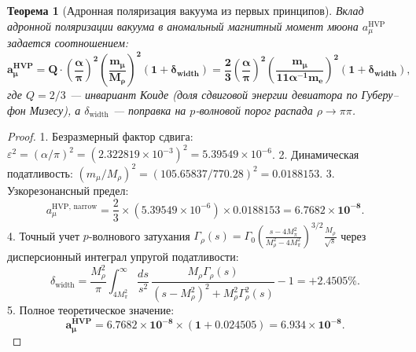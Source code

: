 \documentclass[11pt,a4paper,oneside]{article}
\theoremstyle{plain}
\newtheorem{theorem}{Теорема}[section]
\theoremstyle{definition}
\theoremstyle{remark}
\numberwithin{equation}{section}
\begin{document}
	\begin{theorem}[Адронная поляризация вакуума из первых принципов]
		Вклад адронной поляризации вакуума в аномальный магнитный момент мюона $a_\mu^{\text{HVP}}$ задается соотношением:
		\begin{equation}
			\mathbf{a_\mu^{\text{HVP}} = Q \cdot \left(\frac{\alpha}{\pi}\right)^2 \left(\frac{m_\mu}{M_\rho}\right)^2 (1 + \delta_{\text{width}}) = \frac{2}{3} \left(\frac{\alpha}{\pi}\right)^2 \left(\frac{m_\mu}{11 \alpha^{-1} m_e}\right)^2 (1 + \delta_{\text{width}})},
			\label{eq:hvp_formula}
		\end{equation}
		где $Q = 2/3$ — инвариант Коиде (доля сдвиговой энергии девиатора по Губеру--фон Мизесу), а $\delta_{\text{width}}$ — поправка на $p$-волновой порог распада $\rho \to \pi\pi$.
	\end{theorem}
	
	\begin{proof}
		1. Безразмерный фактор сдвига: $\varepsilon^2 = (\alpha/\pi)^2 = (2.322819 \times 10^{-3})^2 = 5.39549 \times 10^{-6}$.
		2. Динамическая податливость: $(m_\mu / M_\rho)^2 = (105.65837 / 770.28)^2 = 0.0188153$.
		3. Узкорезонансный предел:
		\begin{equation}
			a_\mu^{\text{HVP, narrow}} = \frac{2}{3} \times (5.39549 \times 10^{-6}) \times 0.0188153 = \mathbf{6.7682 \times 10^{-8}}.
		\end{equation}
		4. Точный учет $p$-волнового затухания $\Gamma_\rho(s) = \Gamma_0 \left(\frac{s - 4M_\pi^2}{M_\rho^2 - 4M_\pi^2}\right)^{3/2} \frac{M_\rho}{\sqrt{s}}$ через дисперсионный интеграл упругой податливости:
		\begin{equation}
			\delta_{\text{width}} = \frac{M_\rho^2}{\pi} \int_{4 M_\pi^2}^\infty \frac{ds}{s^2} \, \frac{M_\rho \Gamma_\rho(s)}{(s - M_\rho^2)^2 + M_\rho^2 \Gamma_\rho^2(s)} - 1 = \mathbf{+2.4505\%}.
		\end{equation}
		5. Полное теоретическое значение:
		\begin{equation}
			\mathbf{a_\mu^{\text{HVP}} = 6.7682 \times 10^{-8} \times (1 + 0.024505) = \mathbf{6.934 \times 10^{-8}}}.
		\end{equation}
	\end{proof}
	
\end{document}
